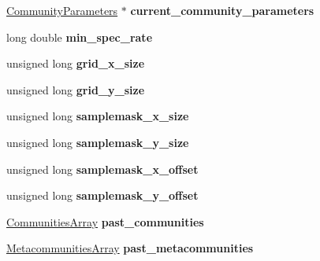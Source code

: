 \begin{DoxyCompactItemize}
\item 
\hyperlink{struct_community_parameters}{Community\+Parameters} $\ast$ {\bfseries current\+\_\+community\+\_\+parameters}\hypertarget{class_community_a77e925f82bee5441d8ec45406066dcfb}{}\label{class_community_a77e925f82bee5441d8ec45406066dcfb}

\item 
long double {\bfseries min\+\_\+spec\+\_\+rate}\hypertarget{class_community_a9dc6f7d4ab75b382be85c2b74edac6b7}{}\label{class_community_a9dc6f7d4ab75b382be85c2b74edac6b7}

\item 
unsigned long {\bfseries grid\+\_\+x\+\_\+size}\hypertarget{class_community_a383dba82c8c76bf5c130c2bf4ac057e5}{}\label{class_community_a383dba82c8c76bf5c130c2bf4ac057e5}

\item 
unsigned long {\bfseries grid\+\_\+y\+\_\+size}\hypertarget{class_community_a308d12fa4ef95015860d4181b075c93f}{}\label{class_community_a308d12fa4ef95015860d4181b075c93f}

\item 
unsigned long {\bfseries samplemask\+\_\+x\+\_\+size}\hypertarget{class_community_a960bb6bb58eaec017d36d16cb3a3bc8a}{}\label{class_community_a960bb6bb58eaec017d36d16cb3a3bc8a}

\item 
unsigned long {\bfseries samplemask\+\_\+y\+\_\+size}\hypertarget{class_community_a10722b2fe8855460946f04f0ae69fd74}{}\label{class_community_a10722b2fe8855460946f04f0ae69fd74}

\item 
unsigned long {\bfseries samplemask\+\_\+x\+\_\+offset}\hypertarget{class_community_ac4985481c86bd62a50fa946699867216}{}\label{class_community_ac4985481c86bd62a50fa946699867216}

\item 
unsigned long {\bfseries samplemask\+\_\+y\+\_\+offset}\hypertarget{class_community_aeaebe975a46d62b70380e50ff7ebd09a}{}\label{class_community_aeaebe975a46d62b70380e50ff7ebd09a}

\item 
\hyperlink{struct_communities_array}{Communities\+Array} {\bfseries past\+\_\+communities}\hypertarget{class_community_a0726a962287af565658aaa8f9d9ea6c1}{}\label{class_community_a0726a962287af565658aaa8f9d9ea6c1}

\item 
\hyperlink{struct_metacommunities_array}{Metacommunities\+Array} {\bfseries past\+\_\+metacommunities}\hypertarget{class_community_ae00d8d9f52d163b040cc716955569ad3}{}\label{class_community_ae00d8d9f52d163b040cc716955569ad3}


\end{DoxyCompactItemize}
